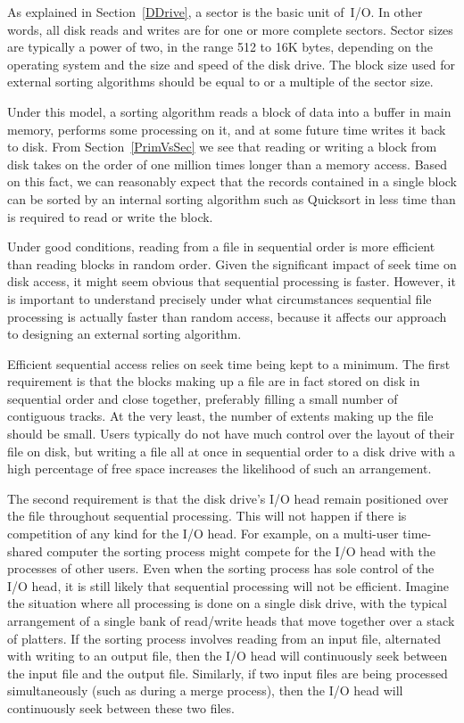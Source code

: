 As explained in Section~\ref{DDrive}, a sector is the basic unit
of~I/O.
In other words, all disk reads and writes are for one or more complete
sectors.
Sector sizes are typically a power of two, in the range 512 to 16K
bytes, depending on the operating system and the size and speed of
the disk drive.
The block size used for external sorting algorithms should be equal to
or a multiple of the sector size.

Under this model, a sorting algorithm reads a block of data into a
buffer in main memory, performs some processing on it, and at some
future time writes it back to disk.
From Section~\ref{PrimVsSec} we see that reading or writing a block
from disk takes on the order of one million times longer than a
memory access.
Based on this fact, we can reasonably expect that the records
contained in a single block can be sorted by an internal
sorting algorithm such as Quicksort
in less time than is required to read or write the block.

Under good conditions, reading from a file in sequential
order is more efficient than reading blocks in random order.
Given the significant impact of seek time on disk access, it
might seem obvious that sequential processing is faster.
However, it is important to understand precisely under what
circumstances sequential file processing is actually faster than
random access, because it affects our approach to designing an external
sorting algorithm.

Efficient sequential access relies on seek time being kept to a minimum.
The first requirement is that the blocks making up a file are in
fact stored on disk in sequential order and close together,
preferably filling a small number of contiguous tracks.
At the very least, the number of extents making up the file should be
small.
Users typically do not have much control over the layout of their file
on disk, but writing a file all at once in sequential order to a disk
drive with a high percentage of free space increases the likelihood of
such an arrangement.

The second requirement is that the disk drive's I/O head remain
positioned over the file throughout sequential processing.
This will not happen if there is competition of any kind for the I/O
head.
For example, on a multi-user time-shared computer the sorting process
might compete for the I/O head with the processes of other users.
Even when the sorting process has sole control of the I/O head, it is
still likely that sequential processing will not be efficient.
Imagine the situation where all processing is done on a single disk
drive, with the typical arrangement of a single bank of read/write
heads that move together over a stack of platters.
If the sorting process involves reading from an input file,
alternated with writing to an output file, then the I/O head will
continuously seek between the input file and the output file.
Similarly, if two input files are being processed simultaneously
(such as during a merge process), then the I/O head will
continuously seek between these two files.

